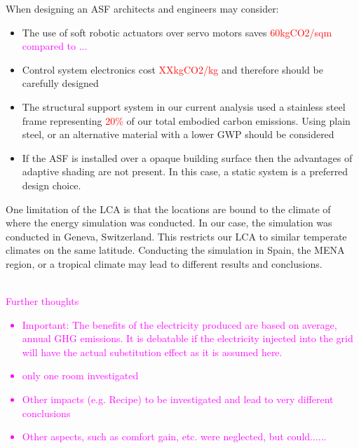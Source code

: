 When designing an ASF architects and engineers may consider: 
\begin{itemize}
\item The use of soft robotic actuators over servo motors saves \textcolor{red}{60kgCO2/sqm} \textcolor{magenta}{compared to ...}
\item Control system electronics cost \textcolor{red}{XXkgCO2/kg} and therefore should be carefully designed
\item The structural support system in our current analysis used a stainless steel frame representing \textcolor{red}{20\%} of our total embodied carbon emissions. Using plain steel, or an alternative material with a lower GWP should be considered
\item If the ASF is installed over a opaque building surface then the advantages of adaptive shading are not present. In this case, a static system is a preferred design choice. 
\end{itemize}


One limitation of the LCA is that the locations are bound to the climate of where the energy simulation was conducted. In our case, the simulation was conducted in Geneva, Switzerland. This restricts our LCA to similar temperate climates on the same latitude. Conducting the simulation in Spain, the MENA region, or a tropical climate may lead to different results and conclusions.

\textcolor{magenta}{
\\Further thoughts
\begin{itemize}
\item Important: The benefits of the electricity produced are based on average, annual GHG emissions. It is debatable if the electricity injected into the grid will have the actual substitution effect as it is assumed here.
\item only one room investigated
\item Other impacts (e.g. Recipe) to be investigated and lead to very different conclusions
\item Other aspects, such as comfort gain, etc. were neglected, but could......
\end{itemize}
}







